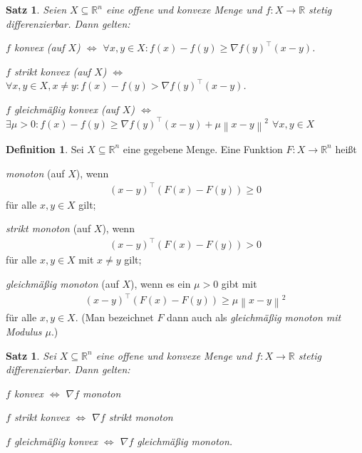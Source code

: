 \documentclass[a4paper,reqno]{amsart}
\newtheorem{satz}[theorem]{Satz}
\theoremstyle{definition}
\newtheorem{definition}[theorem]{Definition}
\theoremstyle{remark}
\newcommand\norm[1]{\left\lVert#1\right\rVert}
\begin{document}
\setcounter{theorem}{4}
\begin{satz}\label{satz3.5}%
    Seien $X\subseteq\mathbb{R}^n$ eine offene und konvexe Menge und
    $f\colon X\to\mathbb{R}$ stetig differenzierbar. Dann gelten:
    \begin{compactenum}[(a)]
        \item $f$ konvex (auf $X$) $\Longleftrightarrow$ $\forall x,y\in X: f(x)-f(y)\geq \nabla f(y)^\top(x-y)$.
        \item $f$ strikt konvex (auf $X$) $\Longleftrightarrow$ $\forall x,y\in X,x\neq y: f(x)-f(y)>\nabla f(y)^\top(x-y)$.
        \item $f$ gleichmäßig konvex (auf $X$) $\Longleftrightarrow$ $\exists \mu>0:f(x)-f(y)\geq \nabla f(y)^\top(x-y) + \mu\norm{x-y}^2$ $\forall x,y\in X$
    \end{compactenum}
\end{satz}

\begin{definition}\label{def3.6}%
    Sei $X\subseteq\mathbb{R}^n$ eine gegebene Menge. Eine Funktion
    $F\colon X\to\mathbb{R}^n$ heißt
    \begin{compactenum}[(a)]
        \item \emph{monoton} (auf $X$), wenn
            \begin{align*}
                (x-y)^\top(F(x)-F(y))\geq 0
            \end{align*}
            für alle $x,y\in X$ gilt;
        \item \emph{strikt monoton} (auf $X$), wenn
            \begin{align*}
                (x-y)^\top(F(x)-F(y))> 0
            \end{align*}
            für alle $x,y\in X$ mit $x\neq y$ gilt;
        \item \emph{gleichmäßig monoton} (auf $X$), wenn es ein $\mu>0$ gibt
            mit
            \begin{align*}
                (x-y)^\top(F(x)-F(y))\geq \mu\norm{x-y}^2
            \end{align*}
            für alle $x,y\in X$. (Man bezeichnet $F$ dann auch als
            \emph{gleichmäßig monoton mit Modulus $\mu$}.)
    \end{compactenum}
\end{definition}

\begin{satz}\label{3.7}%
    Sei $X\subseteq\mathbb{R}^n$ eine offene und konvexe Menge und
    $f\colon X\to\mathbb{R}$ stetig differenzierbar. Dann gelten:
    \begin{compactenum}[(a)]
        \item $f$ konvex $\Longleftrightarrow$ $\nabla f$ monoton
        \item $f$ strikt konvex $\Longleftrightarrow$ $\nabla f$ strikt monoton
        \item $f$ gleichmäßig konvex $\Longleftrightarrow$ $\nabla f$
        gleichmäßig monoton.
    \end{compactenum}
\end{satz}
\end{document}
